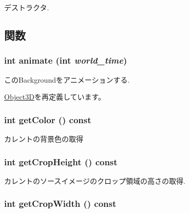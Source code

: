 デストラクタ. 

\subsection{関数}
\hypertarget{classm3g_1_1Background_8aad1ceab4c2a03609c8a42324ce484d}{
\subsubsection[{animate}]{\setlength{\rightskip}{0pt plus 5cm}int animate (int {\em world\_\-time})}}
\label{classm3g_1_1Background_8aad1ceab4c2a03609c8a42324ce484d}


このBackgroundをアニメーションする. 

\hyperlink{classm3g_1_1Object3D_8aad1ceab4c2a03609c8a42324ce484d}{Object3D}を再定義しています。\hypertarget{classm3g_1_1Background_4cfa1931c265ec3412fe3f6408a1b4f5}{
\subsubsection[{getColor}]{\setlength{\rightskip}{0pt plus 5cm}int getColor () const}}
\label{classm3g_1_1Background_4cfa1931c265ec3412fe3f6408a1b4f5}


カレントの背景色の取得 \hypertarget{classm3g_1_1Background_d6d9d6f23b7bb004c93642bcd081f4a3}{
\subsubsection[{getCropHeight}]{\setlength{\rightskip}{0pt plus 5cm}int getCropHeight () const}}
\label{classm3g_1_1Background_d6d9d6f23b7bb004c93642bcd081f4a3}


カレントのソースイメージのクロップ領域の高さの取得. \hypertarget{classm3g_1_1Background_5c6515f6706675ef31ca5dfa0a03b953}{
\subsubsection[{getCropWidth}]{\setlength{\rightskip}{0pt plus 5cm}int getCropWidth () const}}
\label{classm3g_1_1Background_5c6515f6706675ef31ca5dfa0a03b953}


